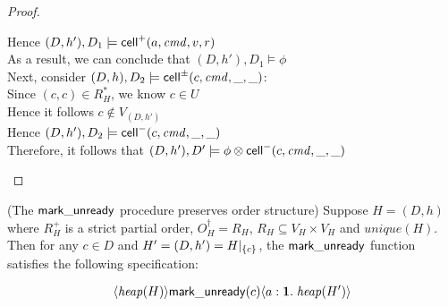 \begin{proof}
\begin{tabbedproof}
\ooooo Hence $(D,h'), D_1 \models \mathsf{cell}^{+}({a}, {\mathit{cmd}}, {v}, {r})$ \\
\oo As a result, we can conclude that $(D,h'), D_1 \models \phi$ \\
\oo Next, consider $(D,h), D_2 \models \mathsf{cell}^{\pm}({c}, {\mathit{cmd}}, {\_}, {\_})$: \\
\ooo Since $(c, c) \in R^*_H$,  we know $c \in U$ \\
\ooo Hence it follows $c \not\in V_{(D, h')}$ \\
\ooo Hence $(D,h'), D_2 \models \mathsf{cell}^{-}({c}, {\mathit{cmd}}, {\_}, {\_})$ \\
\oo Therefore, it follows that $(D,h'), D' \models \phi \otimes \mathsf{cell}^{-}({c}, {\mathit{cmd}}, {\_}, {\_})$ \\ 
\end{tabbedproof}
\end{proof}


\begin{lemma}{(The $\mathsf{mark\_unready}$ procedure preserves order structure)}
Suppose $H = (D,h)$ where $R^+_H$ is a strict partial order,
$O^\dagger_H = R_H$, $R_H \subseteq V_H \times V_H$ and
$\mathit{unique}(H)$. Then for any $c \in D$ and $H' = (D, h') =
H|_{\{{c}\}}$, the $\mathsf{mark\_unready}$ function satisfies the following specification:

\begin{displaymath}
\langle{\mathit{heap}(H)}\rangle{\mathsf{mark\_unready}(c)}\langle{a:\mathbf{1}}.\;{\mathit{heap}(H')}\rangle
\end{displaymath}
  
\end{lemma}

